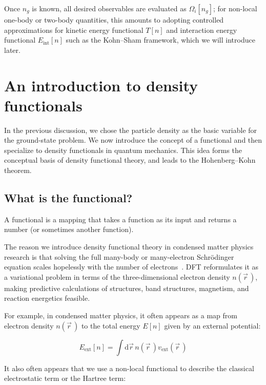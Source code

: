Once $n_g$ is known, all desired observables are evaluated as $\Omega_i[n_g]$; 
for non-local one-body or two-body quantities,
this amounts to adopting controlled approximations for kinetic energy functional $T[n]$ and interaction energy functional $E_\mathrm{int}[n]$ such as the Kohn--Sham framework, which we will introduce later.

\newpage
\section{An introduction to density functionals}
\label{sec:introduction_density_functionals}

In the previous discussion, we chose the particle density as the basic variable for the ground-state problem.
We now introduce the concept of a functional and then specialize to density functionals in quantum mechanics.
This idea forms the conceptual basis of density functional theory,
and leads to the Hohenberg--Kohn theorem.

\subsection{What is the functional?}

A functional is a mapping that takes a function as its input and returns a number (or sometimes another function).

The reason we introduce density functional theory in condensed matter physics research is that solving the full many-body or many-electron Schrödinger equation scales hopelessly with the number of electrons~\cite{becke2014perspective}.
DFT reformulates it as a variational problem in terms of the three-dimensional electron density 
$n(\vec{r}\,)$, making predictive calculations of structures, band structures, magnetism, and reaction energetics feasible.

For example, in condensed matter physics, it often appears as a map from electron density $n(\vec{r}\,)$ to the total energy $E[n]$ given by an external potential:

\begin{equation}
    E_\mathrm{ext}[n]=\int\mathrm{d}\vec{r}\,n(\vec{r}\,)v_\mathrm{ext}(\vec{r}\,)
\label{functional_energy_potential}
\end{equation}

It also often appears that we use a non-local functional to describe the classical electrostatic term or the Hartree term:

